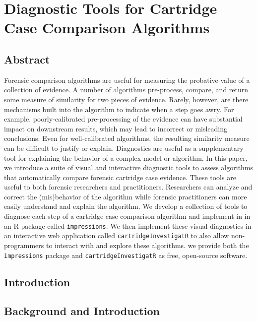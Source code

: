 \documentclass[11pt,]{isuthesis}
\begin{document}
\hypertarget{diagnostic-tools-for-cartridge-case-comparison-algorithms}{%
\chapter{Diagnostic Tools for Cartridge Case Comparison Algorithms}\label{diagnostic-tools-for-cartridge-case-comparison-algorithms}}

\hypertarget{abstract-1}{%
\section*{Abstract}\label{abstract-1}}

Forensic comparison algorithms are useful for measuring the probative value of a collection of evidence.
A number of algorithms pre-process, compare, and return some measure of similarity for two pieces of evidence.
Rarely, however, are there mechanisms built into the algorithm to indicate when a step goes awry.
For example, poorly-calibrated pre-processing of the evidence can have substantial impact on downstream results, which may lead to incorrect or misleading conclusions.
Even for well-calibrated algorithms, the resulting similarity measure can be difficult to justify or explain.
Diagnostics are useful as a supplementary tool for explaining the behavior of a complex model or algorithm.
In this paper, we introduce a suite of visual and interactive diagnostic tools to assess algorithms that automatically compare forensic cartridge case evidence.
These tools are useful to both forensic researchers and practitioners.
Researchers can analyze and correct the (mis)behavior of the algorithm while forensic practitioners can more easily understand and explain the algorithm.
We develop a collection of tools to diagnose each step of a cartridge case comparison algorithm and implement in in an R package called \texttt{impressions}.
We then implement these visual diagnostics in an interactive web application called \texttt{cartridgeInvestigatR} to also allow non-programmers to interact with and explore these algorithms.
we provide both the \texttt{impressions} package and \texttt{cartridgeInvestigatR} as free, open-source software.

\hypertarget{introduction}{%
\section{Introduction}\label{introduction}}

\hypertarget{background-and-introduction}{%
\section{Background and Introduction}\label{background-and-introduction}}
\end{document}
